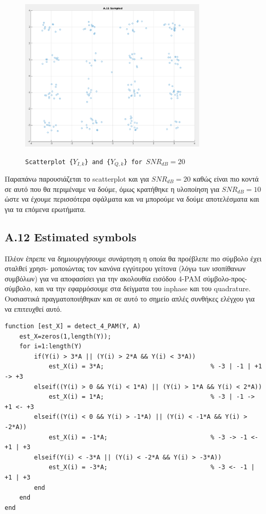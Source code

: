 \documentclass[11pt]{article}
\begin{document}
    \begin{figure}[H]
        \centering
        \includegraphics[scale=0.5, width=0.8\textwidth]{img/A11_SNR_20.png} \\
        \caption{\texttt{Scatterplot \{$Y_{I,k}$\} and \{$Y_{Q,k}$\} for $SNR_{dB}=20$}}
    \end{figure}
    
    \par \noindent
    Παραπάνω παρουσιάζεται το scatterplot και για $SNR_{dB}=20$ καθώς είναι πιο κοντά σε αυτό που θα περιμέναμε να δούμε, όμως κρατήθηκε η υλοποίηση για $SNR_{dB}=10$ ώστε να έχουμε περισσότερα σφάλματα και να μπορούμε να δούμε αποτελέσματα και για τα επόμενα ερωτήματα. 
    
    \subsection*{A.12 Estimated symbols}
    Πλέον έπρεπε να δημιουργήσουμε συνάρτηση η οποία θα προέβλεπε πιο σύμβολο έχει σταλθεί χρησι- μοποιώντας τον κανόνα εγγύτερου γείτονα (λόγω των ισοπίθανων συμβόλων) για να αποφασίσει για την ακολουθία εισόδου 4-PAM σύμβολο-προς-σύμβολο, και να την εφαρμόσουμε στα δείγματα του inphase και του quadrature.
    Ουσιαστικά πραγματοποιήθηκαν και σε αυτό το σημείο απλές συνθήκες ελέγχου για να επιτευχθεί αυτό.
    
    \begin{lstlisting}[caption = {\texttt{detect\_4\_PAM()}}]
function [est_X] = detect_4_PAM(Y, A)
    est_X=zeros(1,length(Y));
    for i=1:length(Y)
        if(Y(i) > 3*A || (Y(i) > 2*A && Y(i) < 3*A))                        
            est_X(i) = 3*A;                             % -3 | -1 | +1 -> +3
        elseif((Y(i) > 0 && Y(i) < 1*A) || (Y(i) > 1*A && Y(i) < 2*A))      
            est_X(i) = 1*A;                             % -3 | -1 -> +1 <- +3
        elseif((Y(i) < 0 && Y(i) > -1*A) || (Y(i) < -1*A && Y(i) > -2*A))   
            est_X(i) = -1*A;                            % -3 -> -1 <- +1 | +3
        elseif(Y(i) < -3*A || (Y(i) < -2*A && Y(i) > -3*A))                 
            est_X(i) = -3*A;                            % -3 <- -1 | +1 | +3
        end
    end
end
    \end{lstlisting}
    
\end{document}
